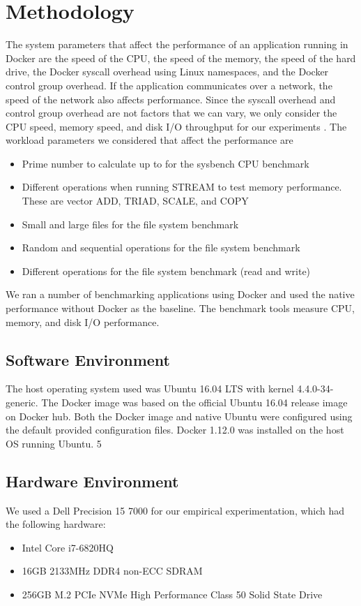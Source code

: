 \documentclass[11pt]{article}
\begin{document}
\section{Methodology}
The system parameters that affect the performance of an application running in Docker are the speed of the CPU, the speed of the memory, the speed of the hard drive, the Docker syscall overhead using Linux namespaces, and the Docker control group overhead. If the application communicates over a network, the speed of the network also affects performance. Since the syscall overhead and control group overhead are not factors that we can vary, we only consider the CPU speed, memory speed, and disk I/O throughput for our experiments \cite{bukh}. The workload parameters we considered that affect the performance are
\begin{itemize}
\item Prime number to calculate up to for the sysbench CPU benchmark
\item Different operations when running STREAM to test memory performance. These are vector ADD, TRIAD, SCALE, and COPY
\item Small and large files for the file system benchmark
\item Random and sequential operations for the file system benchmark
\item Different operations for the file system benchmark (read and write)
\end{itemize}
We ran a number of benchmarking applications using Docker and used the native performance without Docker as the baseline. The benchmark tools measure CPU, memory, and disk I/O performance.

\subsection{Software Environment}
The host operating system used was Ubuntu 16.04 LTS with kernel 4.4.0-34-generic.
The Docker image was based on the official Ubuntu 16.04 release image on Docker hub.
Both the Docker image and native Ubuntu were configured using the default provided configuration files. Docker 1.12.0 was installed on the host OS running Ubuntu.
5
\subsection{Hardware Environment}
We used a Dell Precision 15 7000 for our empirical experimentation, which had the following hardware:
\begin{itemize}
	\item Intel Core i7-6820HQ
	\item 16GB 2133MHz DDR4 non-ECC SDRAM
	\item 256GB M.2 PCIe NVMe High Performance Class 50 Solid State Drive
\end{itemize}
\end{document}
